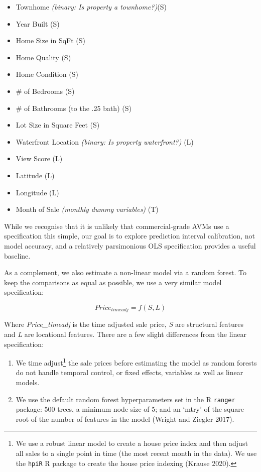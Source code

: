 \documentclass[colTwo]{anon}
\theoremstyle{definition}
\begin{document}
\begin{itemize}
\item Townhome \textit{(binary: Is property a townhome?)}(S)
\item Year Built (S)
\item Home Size in SqFt (S)
\item Home Quality (S)
\item Home Condition (S)
\item \# of Bedrooms (S)
\item \# of Bathrooms (to the .25 bath) (S)
\item Lot Size in Square Feet (S)
\item Waterfront Location \textit{(binary: Is property waterfront?)} (L)
\item View Score (L)
\item Latitude (L)
\item Longitude (L)
\item Month of Sale \textit{(monthly dummy variables)} (T) 
\end{itemize}

While we recognise that it is unlikely that commercial-grade AVMs use a specification this simple, our goal is to explore prediction interval calibration, not model accuracy, and a relatively parsimonious OLS specification provides a useful baseline.  

As a complement, we also estimate a non-linear model via a random forest.  To keep the comparisons as equal as possible, we use a very similar model specification:

\[Price_{timeadj} = f(S, L) \]

Where \textit{Price\_timeadj} is the time adjusted sale price, \textit{S} are structural features and \textit{L} are locational features. There are a few slight differences from the linear specification:

\begin{enumerate}
\item We time adjust\footnote{We use a robust linear model to create a house price index and then adjust all sales to a single point in time (the most recent month in the data).  We use the \texttt{hpiR} R package to create the house price indexing (Krause 2020).} the sale prices before estimating the model as random forests do not handle temporal control, or fixed effects, variables as well as linear models. 
\item We use the default random forest hyperparameters set in the R \texttt{ranger} package: 500 trees, a minimum node size of 5; and an ‘mtry’ of the square root of the number of features in the model (Wright and Ziegler 2017). 
\end{enumerate}
\end{document}
